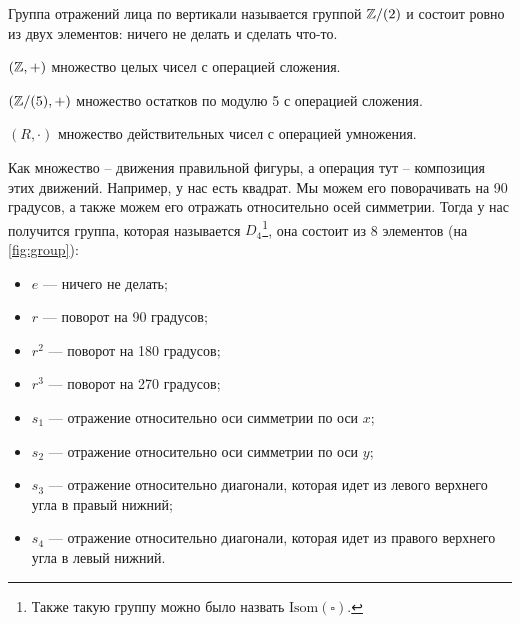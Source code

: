 \begin{example}
    Группа отражений лица по вертикали называется группой $\mathbb Z/(2)$ и состоит ровно из двух элементов: ничего не делать и сделать что-то.
\end{example}
\begin{example}
        $(\mathbb Z, +)$ множество целых чисел с операцией сложения.
\end{example}
\begin{example}
    $({\mathbb Z}/{(5)}, +)$ множество остатков по модулю 5 с операцией сложения.
\end{example}
\begin{example}
    $(R, \cdot)$ множество действительных чисел с операцией умножения.
\end{example}
\begin{example}
    Как множество -- движения правильной фигуры, а операция тут -- композиция этих движений.
    Например, у нас есть квадрат. Мы можем его поворачивать на 90 градусов,
    а также можем его отражать относительно осей симметрии.
    Тогда у нас получится группа, которая называется $D_4$\footnote{
    Также такую группу можно было назвать $\mathrm{Isom}(\square) $.}, 
    она состоит из 8 элементов (на \cref{fig:group}):

    \begin{multicols}{2}
        \begin{itemize} 
            \item $e$ --- ничего не делать;
            \item $r$ --- поворот на 90 градусов;
            \item $r^2$ --- поворот на 180 градусов;
            \item $r^3$ --- поворот на 270 градусов;
            \item $s_1$ --- отражение относительно оси симметрии по оси $x$;
            \item $s_2$ --- отражение относительно оси симметрии по оси $y$;
            \item $s_3$ --- отражение относительно диагонали, которая идет из левого верхнего угла в правый нижний;
            \item $s_4$ --- отражение относительно диагонали, которая идет из правого верхнего угла в левый нижний.
        \end{itemize}
    \end{multicols}
\end{example}

